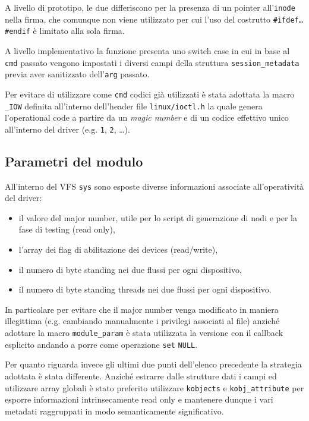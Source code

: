 \documentclass{article}
\begin{document}
A livello di prototipo, le due differiscono per la presenza di un pointer all'\texttt{inode} nella firma, che comunque non viene utilizzato per cui l'uso del costrutto \texttt{\#ifdef\dots\#endif} è limitato alla sola firma.

A livello implementativo la funzione presenta uno switch case in cui in base al \texttt{cmd} passato vengono impostati i diversi campi della struttura \texttt{session\_metadata} previa aver sanitizzato dell'\texttt{arg} passato.

Per evitare di utilizzare come \texttt{cmd} codici già utilizzati è stata adottata la macro \texttt{\_IOW} definita all'interno dell'header file \texttt{linux/ioctl.h} la quale genera l'operational code a partire da un \textit{magic number} e di un codice effettivo unico all'interno del driver (e.g. \texttt{1}, \texttt{2}, \dots).

\subsection{Parametri del modulo}
All'interno del VFS \texttt{sys} sono esposte diverse informazioni associate all'operatività del driver:
\begin{itemize}
        \item il valore del major number, utile per lo script di generazione di nodi e per la fase di testing (read only),
        \item l'array dei flag di abilitazione dei devices (read/write),
        \item il numero di byte standing nei due flussi per ogni dispositivo,
        \item il numero di byte standing threads nei due flussi per ogni dispositivo.
\end{itemize}

In particolare per evitare che il major number venga modificato in maniera illegittima (e.g. cambiando manualmente i privilegi associati al file) anziché adottare la macro \texttt{module\_param} è stata utilizzata la versione con il callback esplicito andando a porre come operazione \texttt{set} \texttt{NULL}.

Per quanto riguarda invece gli ultimi due punti dell'elenco precedente la strategia adottata è stata differente. Anziché estrarre dalle strutture dati i campi ed utilizzare array globali è stato preferito utilizzare \texttt{kobjects} e \texttt{kobj\_attribute} per esporre informazioni intrinsecamente read only e mantenere dunque i vari metadati raggruppati in modo semanticamente significativo.
\end{document}
